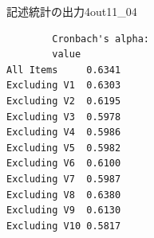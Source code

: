 \begin{Rscreen}{記述統計の出力4}{out11_04}
	\begin{verbatim}
        Cronbach's alpha:
        value
All Items     0.6341
Excluding V1  0.6303
Excluding V2  0.6195
Excluding V3  0.5978
Excluding V4  0.5986
Excluding V5  0.5982
Excluding V6  0.6100
Excluding V7  0.5987
Excluding V8  0.6380
Excluding V9  0.6130
Excluding V10 0.5817
    \end{verbatim}
\end{Rscreen}
